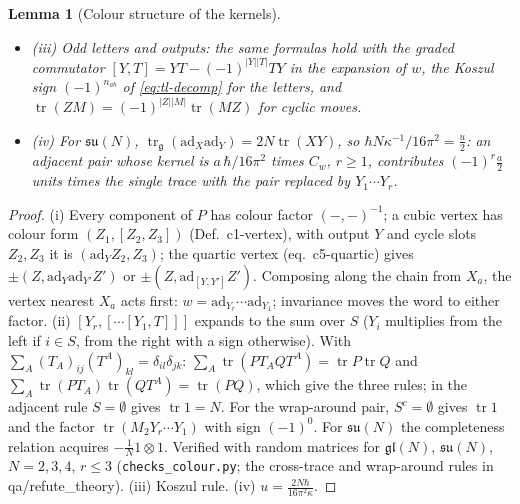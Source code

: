 \documentclass[11pt]{article}
\numberwithin{equation}{section}
\theoremstyle{plain}
\newtheorem{lemma}[theorem]{Lemma}
\theoremstyle{definition}
\begin{document}
\begin{lemma}[Colour structure of the kernels]
\begin{itemize}
\item (iii) Odd letters and outputs: the same formulas hold with the graded commutator $[Y,T]=YT-(-1)^{|Y||T|}TY$ in the expansion of $w$, the Koszul sign $(-1)^{n_{ab}}$ of \eqref{eq:tl-decomp} for the letters, and $\operatorname{tr}(ZM)=(-1)^{|Z||M|}\operatorname{tr}(MZ)$ for cyclic moves.
\item (iv) For $\mathfrak{su}(N)$, $\operatorname{tr}_{\mathfrak g}(\mathrm{ad}_X\mathrm{ad}_Y)=2N\operatorname{tr}(XY)$, so $\hbar N\kappa^{-1}/16\pi^2=\tfrac u2$: an adjacent pair whose kernel is $a\,\hbar/16\pi^2$ times $C_w$, $r\ge1$, contributes $(-1)^r\tfrac a2$ units times the single trace with the pair replaced by $Y_1\cdots Y_r$.
\end{itemize}
\end{lemma}

\begin{proof}
(i) Every component of $P$ has colour factor $(-,-)^{-1}$; a cubic vertex has colour form $(Z_1,[Z_2,Z_3])$ (Def.~c1-vertex), with output $Y$ and cycle slots $Z_2,Z_3$ it is $(\mathrm{ad}_YZ_2,Z_3)$; the quartic vertex (eq.~c5-quartic) gives $\pm(Z,\mathrm{ad}_Y\mathrm{ad}_{Y'}Z')$ or $\pm(Z,\mathrm{ad}_{[Y,Y']}Z')$. Composing along the chain from $X_a$, the vertex nearest $X_a$ acts first: $w=\mathrm{ad}_{Y_r}\cdots\mathrm{ad}_{Y_1}$; invariance moves the word to either factor. (ii) $[Y_r,[\cdots[Y_1,T]]]$ expands to the sum over $S$ ($Y_i$ multiplies from the left if $i\in S$, from the right with a sign otherwise). With $\sum_A(T_A)_{ij}(T^A)_{kl}=\delta_{il}\delta_{jk}$: $\sum_A\operatorname{tr}(PT_AQT^A)=\operatorname{tr}P\operatorname{tr}Q$ and $\sum_A\operatorname{tr}(PT_A)\operatorname{tr}(QT^A)=\operatorname{tr}(PQ)$, which give the three rules; in the adjacent rule $S=\emptyset$ gives $\operatorname{tr}1=N$. For the wrap-around pair, $S^c=\emptyset$ gives $\operatorname{tr}1$ and the factor $\operatorname{tr}(M_2Y_r\cdots Y_1)$ with sign $(-1)^0$. For $\mathfrak{su}(N)$ the completeness relation acquires $-\tfrac1N1\otimes1$. Verified with random matrices for $\mathfrak{gl}(N)$, $\mathfrak{su}(N)$, $N=2,3,4$, $r\le3$ (\texttt{checks\_colour.py}; the cross-trace and wrap-around rules in qa/refute\_theory). (iii) Koszul rule. (iv) $u=\frac{2N\hbar}{16\pi^2\kappa}$.
\end{proof}
\end{document}

